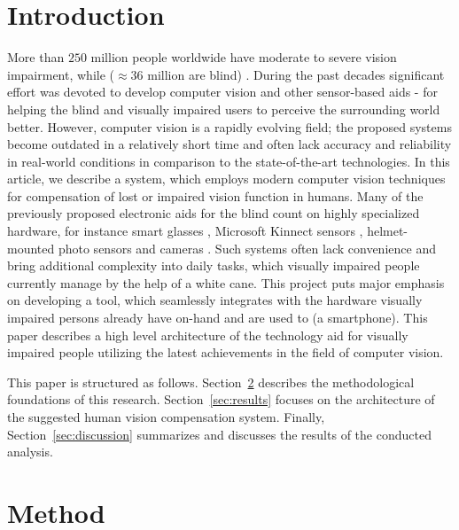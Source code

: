 \documentclass[10pt,conference,compsocconf]{IEEEtran}
\begin{document}
\section{Introduction}
\label{sec:introduction}
More than $250$ million people worldwide have moderate to severe vision impairment, while ($\approx 36$ million are blind) \cite{Bourne}. During the past decades significant effort was devoted to develop computer vision and other sensor-based aids \cite{Caraiman}-\cite{Zientara} for helping the blind and visually impaired users to perceive the surrounding world better. However, computer vision is a rapidly evolving field; the proposed systems become outdated in a relatively short time and often lack accuracy and reliability in real-world conditions in comparison to the state-of-the-art technologies. In this article, we describe a system, which employs modern computer vision techniques for compensation of lost or impaired vision function in humans. Many of the previously proposed electronic aids for the blind count on highly specialized hardware, for instance smart glasses \cite{Zientara}, Microsoft Kinnect sensors \cite{Owayjan}, helmet-mounted photo sensors and cameras \cite{Dunai}. Such systems often lack convenience and bring additional complexity into daily tasks, which visually impaired people currently manage by the help of a white cane. This project puts major emphasis on developing a tool, which seamlessly integrates with the hardware visually impaired persons already have on-hand and are used to (a smartphone). This paper describes a high level architecture of the technology aid for visually impaired people utilizing the latest achievements in the field of computer vision. 

This paper is structured as follows. Section~\ref{sec:method} describes the methodological foundations of this research. Section~\ref{sec:results} focuses on the architecture of the suggested human vision compensation system. Finally, Section~\ref{sec:discussion} summarizes and discusses the results of the conducted analysis.


\section{Method}
\label{sec:method}
\end{document}
